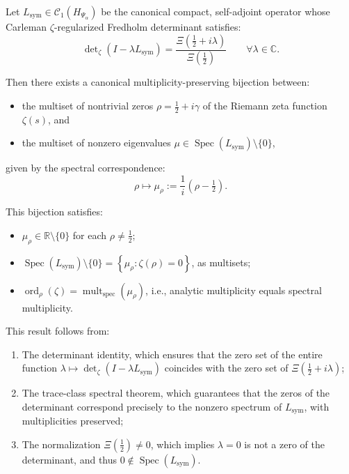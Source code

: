 \begin{theorem}
\label{thm:spectral_zero_bijection_revised}
Let \( L_{\mathrm{sym}} \in \mathcal{C}_1(H_{\Psi_\alpha}) \) be the canonical compact, self-adjoint operator whose Carleman \(\zeta\)-regularized Fredholm determinant satisfies:
\[
\det\nolimits_\zeta(I - \lambda L_{\mathrm{sym}}) = \frac{\Xi\left(\tfrac{1}{2} + i\lambda\right)}{\Xi\left(\tfrac{1}{2}\right)} \qquad \forall \lambda \in \mathbb{C}.
\]

Then there exists a canonical multiplicity-preserving bijection between:
\begin{itemize}
  \item the multiset of nontrivial zeros \( \rho = \tfrac{1}{2} + i\gamma \) of the Riemann zeta function \( \zeta(s) \), and
  \item the multiset of nonzero eigenvalues \( \mu \in \operatorname{Spec}(L_{\mathrm{sym}}) \setminus \{0\} \),
\end{itemize}
given by the spectral correspondence:
\[
\rho \longmapsto \mu_\rho := \frac{1}{i}(\rho - \tfrac{1}{2}).
\]

\medskip

\noindent
This bijection satisfies:
\begin{itemize}
  \item \( \mu_\rho \in \mathbb{R} \setminus \{0\} \) for each \( \rho \ne \tfrac{1}{2} \);
  \item \( \operatorname{Spec}(L_{\mathrm{sym}}) \setminus \{0\} = \left\{ \mu_\rho : \zeta(\rho) = 0 \right\} \), as multisets;
  \item \( \operatorname{ord}_\rho(\zeta) = \operatorname{mult}_{\mathrm{spec}}(\mu_\rho) \), i.e., analytic multiplicity equals spectral multiplicity.
\end{itemize}

\medskip

\noindent
This result follows from:
\begin{enumerate}
  \item The determinant identity, which ensures that the zero set of the entire function \( \lambda \mapsto \det\nolimits_\zeta(I - \lambda L_{\mathrm{sym}}) \) coincides with the zero set of \( \Xi(\tfrac{1}{2} + i\lambda) \);
  \item The trace-class spectral theorem, which guarantees that the zeros of the determinant correspond precisely to the nonzero spectrum of \( L_{\mathrm{sym}} \), with multiplicities preserved;
  \item The normalization \( \Xi(\tfrac{1}{2}) \ne 0 \), which implies \( \lambda = 0 \) is not a zero of the determinant, and thus \( 0 \notin \operatorname{Spec}(L_{\mathrm{sym}}) \).
\end{enumerate}
\end{theorem}
